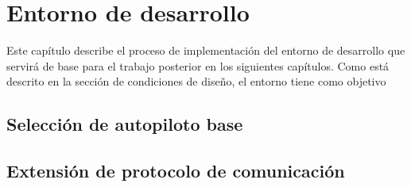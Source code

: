 \chapter{Entorno de desarrollo}

Este capítulo describe el proceso de implementación del entorno de desarrollo que servirá de base para el trabajo posterior en los siguientes capítulos. Como está descrito en la sección de condiciones de diseño, el entorno tiene como objetivo

\section{Selección de autopiloto base}



\section{Extensión de protocolo de comunicación}
